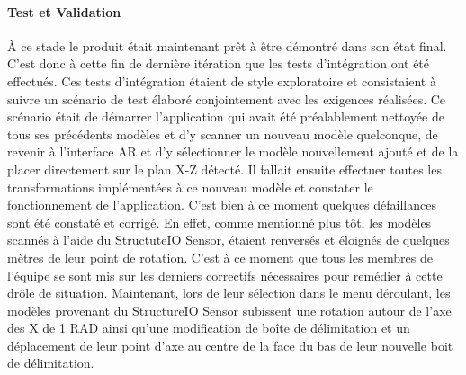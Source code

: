 \documentclass[rapport.tex]{subfiles}
\begin{document}
\paragraph*{Test et Validation}
À ce stade le produit était maintenant prêt à être démontré dans son état final. C’est donc à cette fin de dernière itération que les tests d’intégration ont été effectués. Ces tests d'intégration étaient de style exploratoire et consistaient à suivre un scénario de test élaboré conjointement avec les exigences réalisées. Ce scénario était de démarrer l’application qui avait été préalablement nettoyée de tous ses précédents modèles et d’y scanner un nouveau modèle quelconque, de revenir à l’interface AR et d’y sélectionner le modèle nouvellement ajouté et de la placer directement sur le plan X-Z détecté. Il fallait ensuite effectuer toutes les transformations implémentées à ce nouveau modèle et constater le fonctionnement de l’application. C’est bien à ce moment quelques défaillances sont été constaté et corrigé. En effet, comme mentionné plus tôt, les modèles scannés à l’aide du StructuteIO Sensor, étaient renversés et éloignés de quelques mètres de leur point de rotation. C’est à ce moment que tous les membres de l’équipe se sont mis sur les derniers correctifs nécessaires pour remédier à cette drôle de situation. Maintenant, lors de leur sélection dans le menu déroulant, les modèles provenant du StructureIO Sensor subissent une rotation autour de l’axe des X de 1 RAD ainsi qu’une modification de boîte de délimitation et un déplacement de leur point d’axe au centre de la face du bas de leur nouvelle boit de délimitation.
\end{document}
